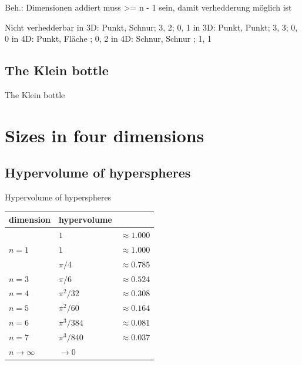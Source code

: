 \documentclass[12pt,compress,ngerman,utf8,t]{beamer}
\renewcommand{\_}{\mathpunct{.}\,}
\begin{document}
Beh.: Dimensionen addiert muss >= n - 1 sein, damit verhedderung möglich ist

Nicht verhedderbar
in 3D: Punkt, Schnur; 3, 2; 0, 1
in 3D: Punkt, Punkt;  3, 3; 0, 0
in 4D: Punkt, Fläche      ; 0, 2
in 4D: Schnur, Schnur     ; 1, 1

\subsection{The Klein bottle}

\begin{frame}{The Klein bottle}
\end{frame}


\section{Sizes in four dimensions}

\subsection{Hypervolume of hyperspheres}

\begin{frame}{Hypervolume of hyperspheres}

  \centering
  \begin{tabular}{lll}
    \toprule
    dimension & hypervolume & \\\midrule
    \only<2>{%
      $n = 0$ & $1$ & $\approx 1.000$ \\
      $n = 1$ & $1$ & $\approx 1.000$ \\
    }%
    $n = 2$ & $\pi / 4$ & $\approx 0.785$ \\
    $n = 3$ & $\pi / 6$ & $\approx 0.524$ \\
    $n = 4$ & $\pi^2 / 32$ & $\approx 0.308$ \\
    $n = 5$ & $\pi^2 / 60$ & $\approx 0.164$ \\
    $n = 6$ & $\pi^3 / 384$ & $\approx 0.081$ \\
    $n = 7$ & $\pi^3 / 840$ & $\approx 0.037$ \\
    $n \to \infty$ & $\to 0$ \\
    \bottomrule
  \end{tabular}\par
\end{frame}
\end{document}
